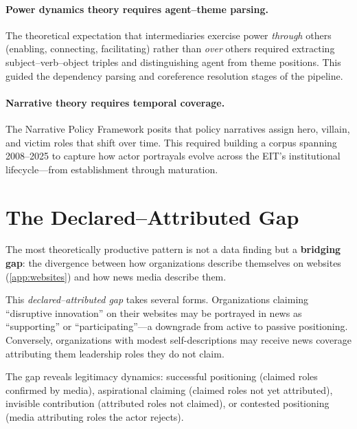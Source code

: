 \documentclass[../main.tex]{subfiles}
\begin{document}
\paragraph{Power dynamics theory requires agent--theme parsing.}
The theoretical expectation that intermediaries exercise power
\emph{through} others (enabling, connecting, facilitating) rather
than \emph{over} others required extracting subject--verb--object
triples and distinguishing agent from theme positions.
This guided the dependency parsing and coreference resolution
stages of the pipeline.

\paragraph{Narrative theory requires temporal coverage.}
The Narrative Policy Framework \parencite{jones2014npf} posits
that policy narratives assign hero, villain, and victim roles
that shift over time.
This required building a corpus spanning 2008--2025
to capture how actor portrayals evolve across the EIT's
institutional lifecycle---from establishment through
maturation.


\section{The Declared--Attributed Gap}
\label{sec:news-gap}

The most theoretically productive pattern is not a data finding
but a \textbf{bridging gap}: the divergence between how organizations
describe themselves on websites (\cref{app:websites}) and how
news media describe them.

This \emph{declared--attributed gap} takes several forms.
Organizations claiming ``disruptive innovation'' on their websites
may be portrayed in news as ``supporting'' or ``participating''---a
downgrade from active to passive positioning.
Conversely, organizations with modest self-descriptions may receive
news coverage attributing them leadership roles they do not claim.

The gap reveals legitimacy dynamics:
successful positioning (claimed roles confirmed by media),
aspirational claiming (claimed roles not yet attributed),
invisible contribution (attributed roles not claimed),
or contested positioning (media attributing roles the actor rejects).
\end{document}
